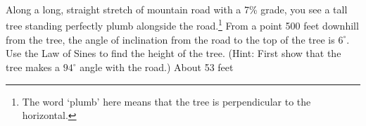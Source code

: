 { Along a long, straight stretch of mountain road with a 7\% grade, you see a tall tree standing perfectly plumb alongside the road.\footnote{The word `plumb' here means that the tree is perpendicular to the horizontal.}  From a point 500 feet downhill from the tree, the angle of inclination from the road to the top of the tree is $6^{\circ}$.  Use the Law of Sines to find the height of the tree.  (Hint: First show that the tree makes a $94^{\circ}$ angle with the road.) \label{lastroadgrade}}
{About 53 feet}
